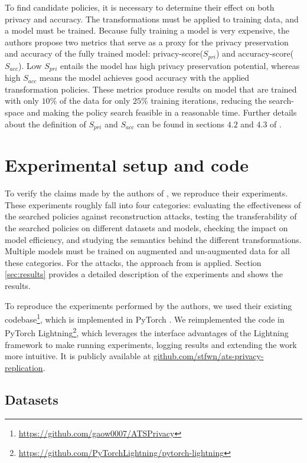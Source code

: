 To find candidate policies, it is necessary to determine their effect on both privacy and accuracy. The transformations must be applied to training data, and a model must be trained. Because fully training a model is very expensive, the authors propose two metrics that serve as a proxy for the privacy preservation and accuracy of the fully trained model: privacy-score($S_{pri}$) and accuracy-score($S_{acc}$). Low $S_{pri}$ entails the model has high privacy preservation potential, whereas high $S_{acc}$ means the model achieves good accuracy with the applied transformation policies. These metrics produce results on model that are trained with only $10\%$ of the data for only $25\%$ training iterations, reducing the search-space and making the policy search feasible in a reasonable time. Further details about the definition of $S_{pri}$ and $S_{acc}$ can be found in sections $4.2$ and $4.3$ of \cite{gao2021privacy}.

\section{Experimental setup and code}

To verify the claims made by the authors of \cite{gao2021privacy}, we reproduce their experiments. These experiments roughly fall into four categories: evaluating the effectiveness of the searched policies against reconstruction attacks, testing the transferability of the searched policies on different datasets and models, checking the impact on model efficiency, and studying the semantics behind the different transformations. Multiple models must be trained on augmented and un-augmented data for all these categories. For the attacks, the approach from \cite{geiping2020inverting} is applied. Section \ref{sec:results} provides a detailed description of the experiments and shows the results.

To reproduce the experiments performed by the authors, we used their existing codebase\footnote{\url{https://github.com/gaow0007/ATSPrivacy}}, which is implemented in PyTorch \cite{pytorch2019}. We reimplemented the code in PyTorch Lightning\footnote{\url{https://github.com/PyTorchLightning/pytorch-lightning}}, which leverages the interface advantages of the Lightning framework to make running experiments, logging results and extending the work more intuitive. It is publicly available at \url{github.com/stfwn/ats-privacy-replication}.

\subsection{Datasets}

